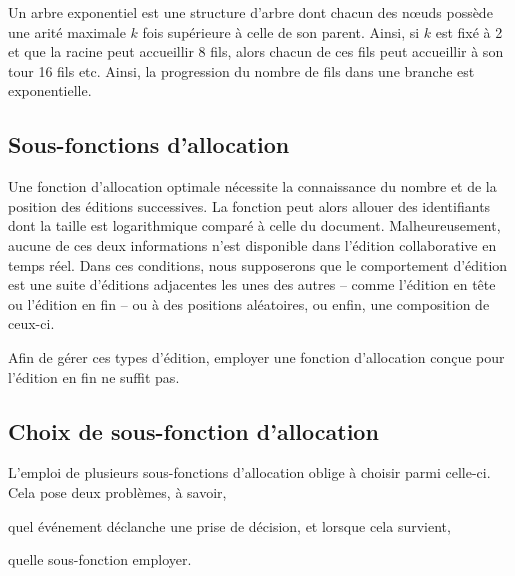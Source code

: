 Un arbre exponentiel est une structure d'arbre dont chacun des nœuds possède une
arité maximale $k$ fois supérieure à celle de son parent. Ainsi, si $k$ est fixé
à 2 et que la racine peut accueillir 8 fils, alors chacun de ces fils peut
accueillir à son tour 16 fils etc. Ainsi, la progression du nombre de fils dans
une branche est exponentielle.



\subsection{Sous-fonctions d'allocation}
\label{repl:subsec:suballocation}

Une fonction d'allocation optimale nécessite la connaissance du nombre et de la
position des éditions successives. La fonction peut alors allouer des
identifiants dont la taille est logarithmique comparé à celle du
document. Malheureusement, aucune de ces deux informations n'est disponible dans
l'édition collaborative en temps réel. Dans ces conditions, nous supposerons que
le comportement d'édition est une suite d'éditions adjacentes les unes des
autres -- comme l'édition en tête ou l'édition en fin -- ou à des positions
aléatoires, ou enfin, une composition de ceux-ci.

Afin de gérer ces types d'édition, employer une fonction d'allocation conçue
pour l'édition en fin ne suffit pas. 

\subsection{Choix de sous-fonction d'allocation}
\label{repl:subsec:allocationchoice}

L'emploi de plusieurs sous-fonctions d'allocation oblige à choisir parmi
celle-ci. Cela pose deux problèmes, à savoir,
\begin{inparaenum}[(i)]
\item quel événement déclanche une prise de décision, et lorsque cela survient, 
\item quelle sous-fonction employer.
\end{inparaenum}


